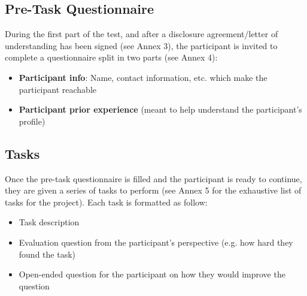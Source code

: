 \documentclass[twocolumn, letterpaper,13pt]{scrartcl}
\begin{document}
    \subsection{Pre-Task Questionnaire}
    
    During the first part of the test, and after a disclosure agreement/letter of understanding has been signed (see Annex 3), the participant is invited to complete a questionnaire split in two parts (see Annex 4):
    \begin{itemize}
        \item \textbf{Participant info}: Name, contact information, etc. which make the participant reachable
        \item \textbf{Participant prior experience} (meant to help understand the participant's profile)
    \end{itemize}
    
    \subsection{Tasks}
    
    Once the pre-task questionnaire is filled and the participant is ready to continue, they are given a series of tasks to perform (see Annex 5 for the exhaustive list of tasks for the project). Each task is formatted as follow:
    \begin{itemize}
        \item Task description
        \item Evaluation question from the participant's perspective (e.g. how hard they found the task)
        \item Open-ended question for the participant on how they would improve the question
    \end{itemize}
    
\end{document}

